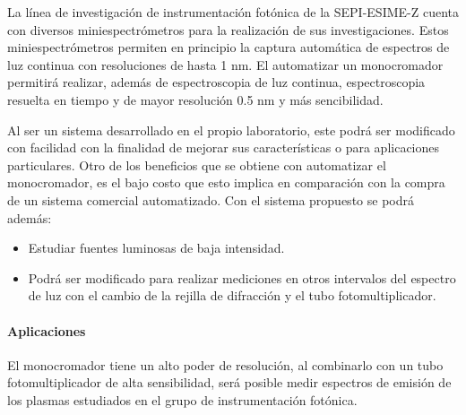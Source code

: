La línea de investigación de instrumentación fotónica de la SEPI-ESIME-Z cuenta con diversos miniespectrómetros para la realización de sus investigaciones. Estos miniespectrómetros permiten en principio la captura automática de espectros de luz continua  con resoluciones de hasta 1 nm. El automatizar un monocromador permitirá realizar, además de espectroscopia de luz continua, espectroscopia resuelta en tiempo y de mayor resolución 0.5 nm y más sencibilidad.


Al ser un sistema desarrollado en el propio laboratorio, este podrá ser modificado con facilidad con la finalidad de mejorar sus características o para aplicaciones particulares. Otro de los beneficios que se obtiene con automatizar el monocromador, es el bajo costo que esto implica en comparación con la compra de un sistema comercial automatizado. Con el sistema propuesto se podrá además:
\begin{itemize}
\item Estudiar fuentes luminosas de baja intensidad.
\item Podrá ser modificado para realizar mediciones en otros intervalos del espectro de luz con el cambio de la rejilla de difracción y el tubo fotomultiplicador.
\end{itemize}

\paragraph{Aplicaciones} 
El monocromador tiene un alto poder de resolución, al combinarlo con un tubo fotomultiplicador de alta sensibilidad, será posible medir espectros de emisión de los plasmas estudiados en el grupo de instrumentación fotónica.
